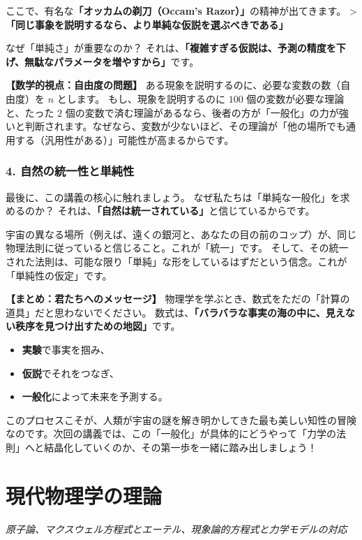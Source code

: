 \documentclass[a4paper,11pt,openany]{ltjsbook}
\begin{document}
\begin{lecturebox}
ここで、有名な\textbf{「オッカムの剃刀（Occam's Razor）」}の精神が出てきます。
> \textbf{「同じ事象を説明するなら、より単純な仮説を選ぶべきである」}

なぜ「単純さ」が重要なのか？ それは、\textbf{「複雑すぎる仮説は、予測の精度を下げ、無駄なパラメータを増やすから」}です。

\textbf{【数学的視点：自由度の問題】}
ある現象を説明するのに、必要な変数の数（自由度）を $n$ とします。
もし、現象を説明するのに $100$ 個の変数が必要な理論と、たった $2$ 個の変数で済む理論があるなら、後者の方が「一般化」の力が強いと判断されます。なぜなら、変数が少ないほど、その理論が「他の場所でも通用する（汎用性がある）」可能性が高まるからです。

\subsection*{4. 自然の統一性と単純性}

最後に、この講義の核心に触れましょう。
なぜ私たちは「単純な一般化」を求めるのか？ それは、\textbf{「自然は統一されている」}と信じているからです。

宇宙の異なる場所（例えば、遠くの銀河と、あなたの目の前のコップ）が、同じ物理法則に従っていると信じること。これが「統一」です。
そして、その統一された法則は、可能な限り「単純」な形をしているはずだという信念。これが「単純性の仮定」です。

\textbf{【まとめ：君たちへのメッセージ】}
物理学を学ぶとき、数式をただの「計算の道具」だと思わないでください。
数式は、\textbf{「バラバラな事実の海の中に、見えない秩序を見つけ出すための地図」}です。

\begin{itemize}[leftmargin=2em]
\item \textbf{実験}で事実を掴み、
\item \textbf{仮説}でそれをつなぎ、
\item \textbf{一般化}によって未来を予測する。
\end{itemize}

このプロセスこそが、人類が宇宙の謎を解き明かしてきた最も美しい知性の冒険なのです。次回の講義では、この「一般化」が具体的にどうやって「力学の法則」へと結晶化していくのか、その第一歩を一緒に踏み出しましょう！
\end{lecturebox}


\clearpage
\chapter{現代物理学の理論}
\begin{center}\large\textit{原子論、マクスウェル方程式とエーテル、現象論的方程式と力学モデルの対応}\end{center}
\end{document}
